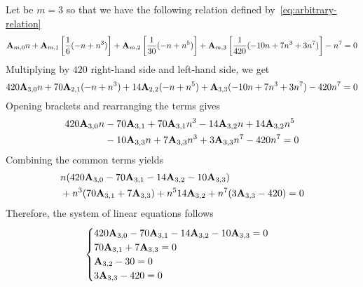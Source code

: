 \begin{examp}
    Let be $m=3$ so that we have the following relation defined by~\eqref{eq:arbitrary-relation}
    \begin{equation*}
        {\mathbf{A}} \sb{m,0} n
        + {\mathbf{A}} \sb{m,1} \left[ \frac{1}{6} (-n + n^3) \right]
        + {\mathbf{A}} \sb{m,2} \left[ \frac{1}{30} (-n + n^5) \right]
        + {\mathbf{A}} \sb{m,3} \left[ \frac{1}{420} (-10 n + 7 n^3 + 3 n^7) \right] - n^7 = 0
    \end{equation*}
    Multiplying by $420$ right-hand side and left-hand side, we get
    \begin{equation*}
        420 {\mathbf{A}} \sb{3,0} n + 70 {\mathbf{A}} \sb{2,1} (-n + n^3) + 14 {\mathbf{A}} \sb{2,2} (-n + n^5) + {\mathbf{A}} \sb{3,3} (-10 n + 7 n^3 + 3 n^7) - 420n^7 = 0
    \end{equation*}
    Opening brackets and rearranging the terms gives
    \begin{equation*}
        \begin{split}
            420 {\mathbf{A}} \sb{3,0} n
            &- 70 {\mathbf{A}} \sb{3,1} + 70 {\mathbf{A}} \sb{3,1} n^3 - 14 {\mathbf{A}} \sb{3,2} n + 14 {\mathbf{A}} \sb{3,2} n^5 \\
            &- 10 {\mathbf{A}} \sb{3,3} n + 7 {\mathbf{A}} \sb{3,3} n^3 + 3 {\mathbf{A}} \sb{3,3} n^7 - 420n^7 = 0
        \end{split}
    \end{equation*}
    Combining the common terms yields
    \begin{equation*}
        \begin{split}
            &n (420 {\mathbf{A}} \sb{3,0} - 70 {\mathbf{A}} \sb{3,1} - 14 {\mathbf{A}} \sb{3,2} - 10 {\mathbf{A}} \sb{3,3}) \\
            &+ n^3 (70 {\mathbf{A}} \sb{3,1} + 7 {\mathbf{A}} \sb{3,3})
            + n^5 14 {\mathbf{A}} \sb{3,2}
            + n^7 (3 {\mathbf{A}} \sb{3,3} - 420)
            = 0
        \end{split}
    \end{equation*}
    Therefore, the system of linear equations follows
    \begin{equation*}
        \begin{cases}
            420 {\mathbf{A}} \sb{3,0} - 70 {\mathbf{A}} \sb{3,1} - 14 {\mathbf{A}} \sb{3,2} - 10 {\mathbf{A}} \sb{3,3} = 0 \\
            70 {\mathbf{A}} \sb{3,1} + 7 {\mathbf{A}} \sb{3,3} = 0 \\
            {\mathbf{A}} \sb{3,2} - 30 = 0 \\
            3 {\mathbf{A}} \sb{3,3} - 420 = 0
        \end{cases}
    \end{equation*}

\end{examp}
